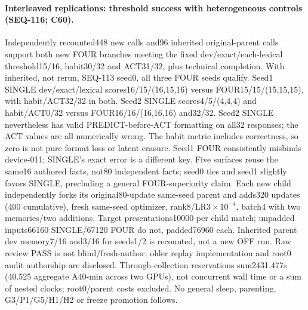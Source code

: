 \documentclass{article}
\begin{document}
\paragraph{Interleaved replications: threshold success with heterogeneous controls (SEQ-116; C60).} Independently recounted448 new calls and96 inherited original-parent calls support both new FOUR branches meeting the fixed dev/exact/each-lexical threshold15/16, habit30/32 and ACT31/32, plus technical completion. With inherited, not rerun, SEQ-113 seed0, all three FOUR seeds qualify. Seed1 SINGLE dev/exact/lexical scores16/15/(16,15,16) versus FOUR15/15/(15,15,15), with habit/ACT32/32 in both. Seed2 SINGLE scores4/5/(4,4,4) and habit/ACT0/32 versus FOUR16/16/(16,16,16) and32/32. Seed2 SINGLE nevertheless has valid PREDICT-before-ACT formatting on all32 responses; the ACT values are all numerically wrong. The habit metric includes correctness, so zero is not pure format loss or latent erasure. Seed1 FOUR consistently misbinds device-011; SINGLE's exact error is a different key. Five surfaces reuse the same16 authored facts, not80 independent facts; seed0 ties and seed1 slightly favors SINGLE, precluding a general FOUR-superiority claim. Each new child independently forks its original80-update same-seed parent and adds320 updates (400 cumulative), fresh same-seed optimizer, rank8/LR$3\times10^{-4}$, batch4 with two memories/two additions. Target presentations10000 per child match; unpadded inputs66160 SINGLE/67120 FOUR do not, padded76960 each. Inherited parent dev memory7/16 and3/16 for seeds1/2 is recounted, not a new OFF run. Raw review PASS is not blind/fresh-author: older replay implementation and root0 audit authorship are disclosed. Through-collection reservations sum2431.477s (40.525 aggregate A40-min across two GPUs), not concurrent wall time or a sum of nested clocks; root0/parent costs excluded. No general sleep, parenting, G3/P1/G5/H1/H2 or freeze promotion follows.
\end{document}
